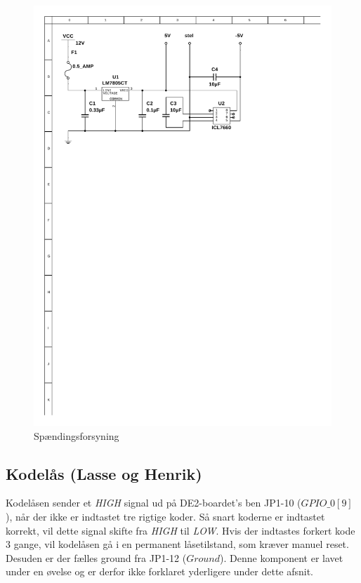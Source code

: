 \begin{figure}[h]
	\centering
	\includegraphics[scale=1,trim=50 555 150 50, clip=true]{../HardwareDesign/Diagrammer/Stroemforsyning.pdf}
	\caption{Spændingsforsyning}
	\label{fig:Stromforsyning}
\end{figure}

\subsection{Kodelås (Lasse og Henrik)}
Kodelåsen sender et \textit{HIGH} signal ud på DE2-boardet's ben JP1-10 ($GPIO{\_}0[9]$), når der ikke er indtastet tre rigtige koder. Så snart koderne er indtastet korrekt, vil dette signal skifte fra \textit{HIGH} til \textit{LOW}. Hvis der indtastes forkert kode 3 gange, vil kodelåsen gå i en permanent låsetilstand, som kræver manuel reset. Desuden er der fælles ground fra JP1-12 ($Ground$).
Denne komponent er lavet under en øvelse og er derfor ikke forklaret yderligere under dette afsnit.

